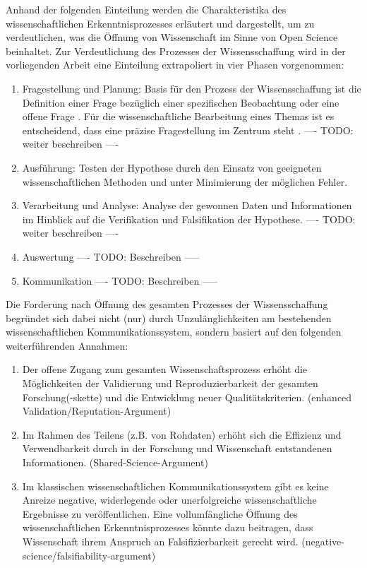 Anhand der folgenden Einteilung werden die Charakteristika des wissenschaftlichen Erkenntnisprozesses erläutert und dargestellt, um zu verdeutlichen, was die Öffnung von Wissenschaft im Sinne von Open Science beinhaltet. Zur Verdeutlichung des Prozesses der Wissensschaffung wird in der vorliegenden Arbeit eine Einteilung extrapoliert in vier Phasen vorgenommen:
\begin{enumerate}
\item Fragestellung und Planung: Basis für den Prozess der Wissensschaffung ist die Definition einer Frage bezüglich einer spezifischen Beobachtung oder eine offene Frage \cite{suchen}. Für die wissenschaftliche Bearbeitung eines Themas ist es entscheidend, dass eine präzise Fragestellung im Zentrum steht \cite{suchen}. ---- TODO: weiter beschreiben ----
\item Ausführung: Testen der Hypothese durch den Einsatz von geeigneten wissenschaftlichen Methoden und unter Minimierung der möglichen Fehler.
\item Verarbeitung und Analyse: Analyse der gewonnen Daten und Informationen im Hinblick auf die Verifikation und Falsifikation der Hypothese. ---- TODO: weiter beschreiben ----
\item Auswertung ---- TODO: Beschreiben -----
\item Kommunikation ---- TODO: Beschreiben -----
\end{enumerate}

Die Forderung nach Öffnung des gesamten Prozesses der Wissensschaffung begründet sich dabei nicht (nur) durch Unzulänglichkeiten am bestehenden wissenschaftlichen Kommunikationssystem, sondern basiert auf den folgenden weiterführenden Annahmen:
\begin{enumerate}
\item Der offene Zugang zum gesamten Wissenschaftsprozess erhöht die Möglichkeiten der Validierung und Reproduzierbarkeit der gesamten Forschung(-skette) und die Entwicklung neuer Qualitätskriterien. (enhanced Validation/Reputation-Argument)
\item Im Rahmen des Teilens (z.B. von Rohdaten) erhöht sich die Effizienz und Verwendbarkeit durch in der Forschung und Wissenschaft entstandenen Informationen. (Shared-Science-Argument)
\item Im klassischen wissenschaftlichen Kommunikationssystem gibt es keine Anreize negative, widerlegende oder unerfolgreiche wissenschaftliche Ergebnisse zu veröffentlichen. Eine vollumfängliche Öffnung des wissenschaftlichen Erkenntnisprozesses könnte dazu beitragen, dass Wissenschaft ihrem Anspruch an Falsifizierbarkeit gerecht wird. (negative-science/falsifiability-argument)
\end{enumerate}

